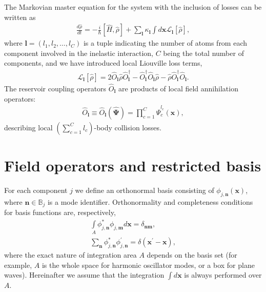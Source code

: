 \documentclass[12pt,aip,jmp,amssymb,amsmath]{revtex4-1}
\begin{document}
The Markovian master equation for the system with the inclusion of losses can be written as~\cite{Jack2002}
\begin{eqnarray}\label{eqn:master-eqn:master-eqn}
    \frac{d\hat{\rho}}{dt} =
        - \frac{i}{\hbar} \left[ \hat{H}, \hat{\rho} \right]
        + \sum_{\boldsymbol{l}} \kappa_{\boldsymbol{l}} \int d\boldsymbol{x}
            \mathcal{L}_{\boldsymbol{l}} \left[ \hat{\rho} \right],
\end{eqnarray}
where $\boldsymbol{l} = (l_1, l_2, \ldots, l_C)$ is a tuple indicating the number of atoms from each component involved in the inelastic interaction, $C$ being the total number of components, and we have introduced local Liouville loss terms,
\begin{eqnarray}\label{eqn:master-eqn:loss-term}
    \mathcal{L}_{\boldsymbol{l}} \left[ \hat{\rho} \right] =
        2\hat{O}_{\boldsymbol{l}} \hat{\rho} \hat{O}_{\boldsymbol{l}}^\dagger
        - \hat{O}_{\boldsymbol{l}}^\dagger \hat{O}_{\boldsymbol{l}} \hat{\rho}
        - \hat{\rho} \hat{O}_{\boldsymbol{l}}^\dagger \hat{O}_{\boldsymbol{l}}.
\end{eqnarray}
The reservoir coupling operators $\hat{O}_{\boldsymbol{l}}$ are products of local field annihilation operators:
\begin{eqnarray}
    \hat{O}_{\boldsymbol{l}}
    \equiv \hat{O}_{\boldsymbol{l}} (\hat{\boldsymbol{\Psi}})
    = \prod_{c=1}^C \hat{\Psi}_c^{l_c} (\boldsymbol{x}),
\end{eqnarray}
describing local $\left( \sum_{c=1}^C l_c \right)$-body collision losses.



\section{Field operators and restricted basis}
\label{sec:func-operators}

For each component $j$ we define an orthonormal basis consisting of $\phi_{j,\boldsymbol{n}}(\boldsymbol{x})$, where $\boldsymbol{n} \in \mathbb{B}_j$ is a mode identifier.
Orthonormality and completeness conditions for basis functions are, respectively,
\begin{eqnarray}
    \int\limits_A \phi_{j,\boldsymbol{n}}^* \phi_{j,\boldsymbol{m}} d\boldsymbol{x} = \delta_{\boldsymbol{n}\boldsymbol{m}}, \\
    \sum_{\boldsymbol{n}} \phi_{j,\boldsymbol{n}}^* \phi_{j,\boldsymbol{n}}^\prime = \delta(\boldsymbol{x}^\prime - \boldsymbol{x}),
\end{eqnarray}
where the exact nature of integration area $A$ depends on the basis set (for example, $A$ is the whole space for harmonic oscillator modes, or a box for plane waves).
Hereinafter we assume that the integration $\int d\boldsymbol{x}$ is always performed over $A$.
\end{document}
